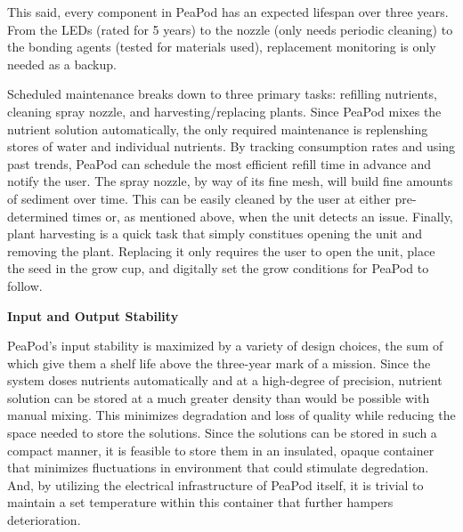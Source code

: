 \documentclass{report}
\begin{document}
This said, every component in PeaPod has an expected lifespan over three years. From the LEDs (rated for 5 years) to the nozzle (only needs periodic cleaning) to the bonding agents (tested for materials used), replacement monitoring is only needed as a backup.

Scheduled maintenance breaks down to three primary tasks: refilling nutrients, cleaning spray nozzle, and harvesting/replacing plants.
Since PeaPod mixes the nutrient solution automatically, the only required maintenance is replenshing stores of water and individual nutrients. By tracking consumption rates and using past trends, PeaPod can schedule the most efficient refill time in advance and notify the user.
The spray nozzle, by way of its fine mesh, will build fine amounts of sediment over time. This can be easily cleaned by the user at either pre-determined times or, as mentioned above, when the unit detects an issue.
Finally, plant harvesting is a quick task that simply constitues opening the unit and removing the plant. Replacing it only requires the user to open the unit, place the seed in the grow cup, and digitally set the grow conditions for PeaPod to follow.

\textbf{Input and Output Stability}
\label{sec:reliability-inputoutput}






PeaPod's input stability is maximized by a variety of design choices, the sum of which give them a shelf life above the three-year mark of a mission. Since the system doses nutrients automatically and at a high-degree of precision, nutrient solution can be stored at a much greater density than would be possible with manual mixing. This minimizes degradation and loss of quality while reducing the space needed to store the solutions. Since the solutions can be stored in such a compact manner, it is feasible to store them in an insulated, opaque container that minimizes fluctuations in environment that could stimulate degredation. And, by utilizing the electrical infrastructure of PeaPod itself, it is trivial to maintain a set temperature within this container that further hampers deterioration.
\end{document}
